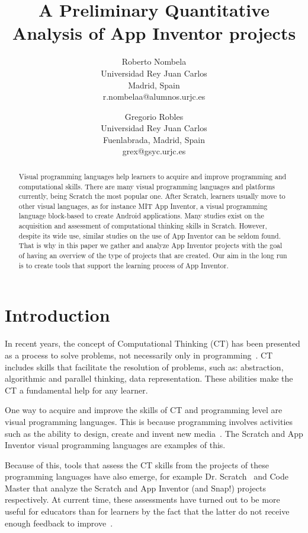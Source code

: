\documentclass[a4paper]{article}
\title{A Preliminary Quantitative Analysis of App Inventor projects}
\author{
Roberto Nombela \\ Universidad Rey Juan Carlos\\
                Madrid, Spain \\ r.nombelaa@alumnos.urjc.es
\and
Gregorio Robles \\Universidad Rey Juan Carlos \\
                Fuenlabrada, Madrid, Spain \\grex@gsyc.urjc.es
}
\begin{document}
\maketitle

\begin{abstract}
Visual programming languages help learners to acquire and improve programming and computational skills.
There are many visual programming languages and platforms currently, being Scratch the most popular one.
After Scratch, learners usually move to other visual languages, as for instance MIT App Inventor, a visual programming language block-based to create Android applications.
Many studies exist on the acquisition and assessment of computational thinking skills in Scratch.
However, despite its wide use, similar studies on the use of App Inventor can be seldom found.
That is why in this paper we gather and analyze App Inventor projects with the goal of having an overview of the type of projects that are created.
Our aim in the long run is to create tools that support the learning process of App Inventor.
\end{abstract}


\section{Introduction}
In recent years, the concept of Computational Thinking (CT) has been presented as a process to solve problems, not necessarily only in programming~\cite{wing2006computational}. 
CT includes skills that facilitate the resolution of problems, such as: abstraction, algorithmic and parallel thinking, data representation. These abilities make the CT a fundamental help for any learner.

One way to acquire and improve the skills of CT and programming level are visual programming languages.
This is because programming involves activities such as the ability to design, create and invent new media~\cite{resnick2009scratch}.
The Scratch and App Inventor visual programming languages are examples of this.

Because of this, tools that assess the CT skills from the projects of these programming languages have also emerge, for example Dr. Scratch~\cite{moreno2015dr} and Code Master that analyze the Scratch and App Inventor (and Snap!) projects respectively. 
At current time, these assessments have turned out to be more useful for educators than for learners by the fact that the latter do not receive enough feedback to improve~\cite{robles2018ontools}.
\end{document}
